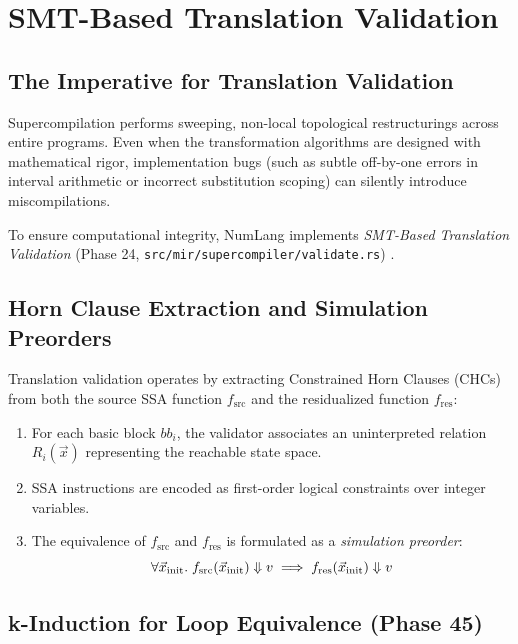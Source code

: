 \chapter{SMT-Based Translation Validation}
\label{chap:validation}

\section{The Imperative for Translation Validation}
\label{sec:validation:intro}

Supercompilation performs sweeping, non-local topological restructurings across entire programs. Even when the transformation algorithms are designed with mathematical rigor, implementation bugs (such as subtle off-by-one errors in interval arithmetic or incorrect substitution scoping) can silently introduce miscompilations.

To ensure computational integrity, NumLang implements \emph{SMT-Based Translation Validation} (Phase 24, \texttt{src/mir/supercompiler/validate.rs}) \citep{pnueli1998translation}.

\section{Horn Clause Extraction and Simulation Preorders}
\label{sec:validation:horn}

Translation validation operates by extracting Constrained Horn Clauses (CHCs) from both the source SSA function $f_{\text{src}}$ and the residualized function $f_{\text{res}}$:
\begin{enumerate}
    \item For each basic block $bb_i$, the validator associates an uninterpreted relation $R_i(\vec{x})$ representing the reachable state space.
    \item SSA instructions are encoded as first-order logical constraints over integer variables.
    \item The equivalence of $f_{\text{src}}$ and $f_{\text{res}}$ is formulated as a \emph{simulation preorder}:
    \begin{equation}
    \forall \vec{x}_{\text{init}}.\; f_{\text{src}}(\vec{x}_{\text{init}}) \Downarrow v \implies f_{\text{res}}(\vec{x}_{\text{init}}) \Downarrow v
    \end{equation}
\end{enumerate}

\section{k-Induction for Loop Equivalence (Phase 45)}
\label{sec:validation:k_induction}

